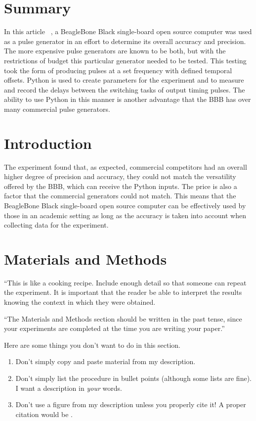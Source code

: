 \documentclass[10pt,twocolumn]{article}
\begin{document}
\section{Summary} 
\label{sec:summary}
In this article ~\citep{Fedrizzi2015}, a BeagleBone Black single-board open source computer was used as a pulse generator in an effort to determine its overall accuracy and precision. The more expensive pulse generators are known to be both, but with the restrictions of budget this particular generator needed to be tested. This testing took the form of producing pulses at a set frequency with defined temporal offsets. Python is used to create parameters for the experiment and to measure and record the delays between the switching tasks of output timing pulses. The ability to use Python in this manner is another advantage that the BBB has over many commercial pulse generators.

\section{Introduction} 
\label{sec:introduction}

The experiment found that, as expected, commercial competitors had an overall higher degree of precision and accuracy, they could not match the versatility offered by the BBB, which can receive the Python inputs. The price is also a factor that the commercial generators could not match. This means that the BeagleBone Black single-board open source computer can be effectively used by those in an academic setting as long as the accuracy is taken into account when collecting data for the experiment.  

\section{Materials and Methods}

``This is like a cooking recipe. Include enough detail so that someone can repeat the experiment. It is important that the reader be able to interpret the results knowing the context in which they were obtained.

``The Materials and Methods section should be written in the past tense, since your experiments are completed at the time you are writing your paper.''

Here are some things you don't want to do in this section.

\begin{enumerate}
\item 
Don't simply copy and paste material from my description. 
\item 
Don't simply list the procedure in bullet points (although some lists are fine). I want a description in \emph{your} words.
\item
Don't use a figure from my description unless you properly cite it! A proper citation would be \citep[p.~32]{Picone2018}.
\end{enumerate}
\end{document}
